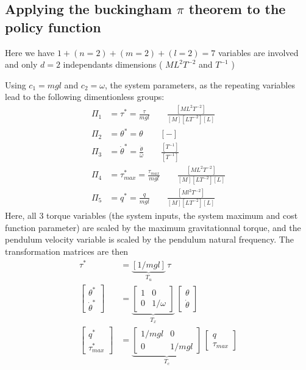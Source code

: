 
\newpage 
\subsection{Applying the buckingham $\pi$ theorem to the policy function}

Here we have $1+(n=2)+(m=2)+(l=2)=7$ variables are involved and only $d=2$ independants dimensions ( $ML^2T^{-2}$ and $T^{-1}$ )

Using $c_1 = mgl$ and $c_2 = \omega$, the system parameters, as the repeating variables lead to the following dimentionless groups:
\begin{align}
\Pi_1 &= \tau^* = \frac{\tau}{mgl} \quad \quad \frac{[ML^2T^{-2}]}{[M][LT^{-2}][L]} \\
\Pi_2 &= \theta^* = \theta \quad \quad [-]\\
\Pi_3 &= \dot{\theta}^* = \frac{ \dot{\theta}  }{ \omega } \quad \quad \frac{[T^{-1}]}{[T^{-1}]} \\
\Pi_4 &= \tau_{max}^* = \frac{\tau_{max}}{mgl} \quad \quad \frac{[ML^2T^{-2}]}{[M][LT^{-2}][L]} \\
\Pi_5 &= q^* = \frac{q}{mgl} \quad \quad \frac{[Ml^2T^{-2}]}{[M][LT^{-2}][L]} 
\end{align}
Here, all 3 torque variables (the system inputs, the system maximum and cost function parameter) are scaled by the maximum gravitationnal torque, and the pendulum velocity variable is scaled by the pendulum natural frequency. The transformation matrices are then
\begin{align}
\tau^* &= 
\underbrace{\left[  1/mgl \right]}_{T_u}
\, \tau  \label{eq:Tupendulum} \\
\begin{bmatrix}
\theta^* \\ \dot{\theta}^*
\end{bmatrix} &= 
\underbrace{
\begin{bmatrix}
    1 & 0 \\ 0 & 1/\omega
\end{bmatrix}
}_{T_x} \, 
\begin{bmatrix}
\theta \\ \dot{\theta}
\end{bmatrix}
 \label{eq:Txpendulum} \\
\begin{bmatrix}
q^* \\ \tau_{max}^*
\end{bmatrix} &= 
\underbrace{
\begin{bmatrix}
      1/mgl & 0 \\ 0 &  1/mgl
\end{bmatrix}
}_{T_c} \, 
\begin{bmatrix}
q \\ \tau_{max}
\end{bmatrix}
 \label{eq:Tcpendulum} 
\end{align}

